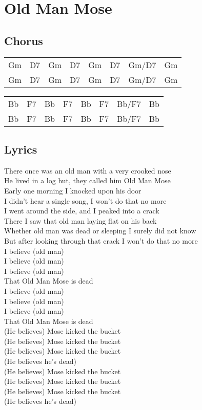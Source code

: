 \section{Old Man Mose}


\subsection*{Chorus}


\begin{tabular}{l l l l l l l l}
Gm & D7 & Gm & D7 & Gm & D7 & Gm/D7 & Gm \\ 
Gm & D7 & Gm & D7 & Gm & D7 & Gm/D7 & Gm \\ 
\end{tabular}


\begin{tabular}{l l l l l l l l}
Bb & F7 & Bb & F7 & Bb & F7 & Bb/F7 & Bb \\ 
Bb & F7 & Bb & F7 & Bb & F7 & Bb/F7 & Bb \\ 
\end{tabular}


\subsection*{Lyrics}


There once was an old man with a very crooked nose \\ 
He lived in a log hut, they called him Old Man Mose \\ 
Early one morning I knocked upon his door \\ 
I didn't hear a single song, I won't do that no more \\ 

I went around the side, and I peaked into a crack \\ 
There I saw that old man laying flat on his back \\ 
Whether old man was dead or sleeping I surely did not know \\ 
But after looking through that crack I won't do that no more \\ 

I believe (old man) \\ 
I believe (old man) \\ 
I believe (old man) \\ 
That Old Man Mose is dead \\ 
I believe (old man) \\ 
I believe (old man) \\ 
I believe (old man) \\ 
That Old Man Mose is dead \\ 

(He believes) Mose kicked the bucket \\ 
(He believes) Mose kicked the bucket \\ 
(He believes) Mose kicked the bucket \\ 
(He believes he's dead) \\ 
(He believes) Mose kicked the bucket \\ 
(He believes) Mose kicked the bucket \\ 
(He believes) Mose kicked the bucket \\ 
(He believes he's dead) \\ 
